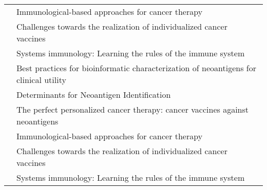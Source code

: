 \begin{table}[]
\begin{tabular}{p{3cm}p{10cm}}
		\cite{barros2018immunological}& Immunological-based approaches for cancer therapy                                                                                             \\
		\cite{tureci2018challenges}   & Challenges towards the realization of individualized cancer vaccines                                                                          \\
		\cite{villani2018systems}     & Systems immunology: Learning the rules of the immune system                                                                                   \\
		\cite{richters2019best}       & Best practices for bioinformatic characterization of neoantigens for clinical utility                                                         \\
		\cite{garcia2019determinants} & Determinants for Neoantigen Identification                                                                                                    \\
		\cite{aurisicchio2018perfect} & The perfect personalized cancer therapy: cancer vaccines against neoantigens                                                                  \\
		\cite{barros2018immunological}& Immunological-based approaches for cancer therapy                                                                                             \\
		\cite{tureci2018challenges}   & Challenges towards the realization of individualized cancer vaccines                                                                          \\
		\cite{villani2018systems}     & Systems immunology: Learning the rules of the immune system                                                                                  
	\end{tabular}
\end{table}

